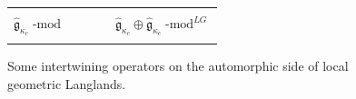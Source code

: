 \documentclass[10pt]{amsart}
\newcommand{\fgc}{\widehat{\fg}_{\kappa_c}}
\newcommand{\fg}{\mathfrak{g}}
\newcommand{\on}{\operatorname}
\renewcommand{\mod}{\on{-mod}}
\theoremstyle{remark}
\numberwithin{equation}{section}
\renewcommand{\mod}{\operatorname{-mod}}
\begin{document}
\begin{center}
\begin{figure}
\begin{tabular}{|c |c| c| c| c|}
			
			\\ \hline   & &&& \\$\fgc\mod$ &&&&  \hspace{0mm}$\fgc\oplus 
			\fgc\mod^{LG}$  \hspace{0mm}\\  & &&& 
			\\ 
			\hline 		\end{tabular}
			    		\caption{Some intertwining operators on the automorphic side of local 
		geometric Langlands.}
		

		\label{f:tableaut}

	\end{figure}
\end{center}
\end{document}
